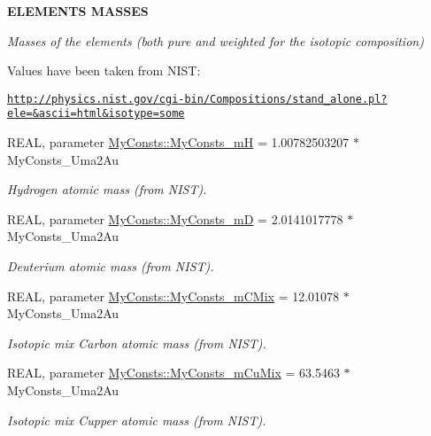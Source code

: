 \begin{Indent}{\bf ELEMENTS MASSES}\par
{\em \label{_amgrp9ee2c80ba04aa74b67659c257da42bf0}
Masses of the elements (both pure and weighted for the isotopic composition) \par
 Values have been taken from NIST:\par
 \href{http://physics.nist.gov/cgi-bin/Compositions/stand_alone.pl?ele=&ascii=html&isotype=some}{\tt http://physics.nist.gov/cgi-\/bin/Compositions/stand\_\-alone.pl?ele=\&ascii=html\&isotype=some} }\begin{DoxyCompactItemize}
\item 
REAL, parameter \hyperlink{namespace_my_consts_a6f63ce440e87b3a56e3497bfa4f8fe89}{MyConsts::MyConsts\_\-mH} = 1.00782503207 $\ast$ MyConsts\_\-Uma2Au
\begin{DoxyCompactList}\small\item\em Hydrogen atomic mass (from NIST). \item\end{DoxyCompactList}\item 
REAL, parameter \hyperlink{namespace_my_consts_a1f26a10350f900a32cfaac2147965359}{MyConsts::MyConsts\_\-mD} = 2.0141017778 $\ast$ MyConsts\_\-Uma2Au
\begin{DoxyCompactList}\small\item\em Deuterium atomic mass (from NIST). \item\end{DoxyCompactList}\item 
REAL, parameter \hyperlink{namespace_my_consts_a0e6de90a68dfbeb30ff2510d3a0f4f33}{MyConsts::MyConsts\_\-mCMix} = 12.01078 $\ast$ MyConsts\_\-Uma2Au
\begin{DoxyCompactList}\small\item\em Isotopic mix Carbon atomic mass (from NIST). \item\end{DoxyCompactList}\item 
REAL, parameter \hyperlink{namespace_my_consts_a3e9915df2fca44d18350e2829d68c34a}{MyConsts::MyConsts\_\-mCuMix} = 63.5463 $\ast$ MyConsts\_\-Uma2Au
\begin{DoxyCompactList}\small\item\em Isotopic mix Cupper atomic mass (from NIST). \item\end{DoxyCompactList}\end{DoxyCompactItemize}
\end{Indent}
